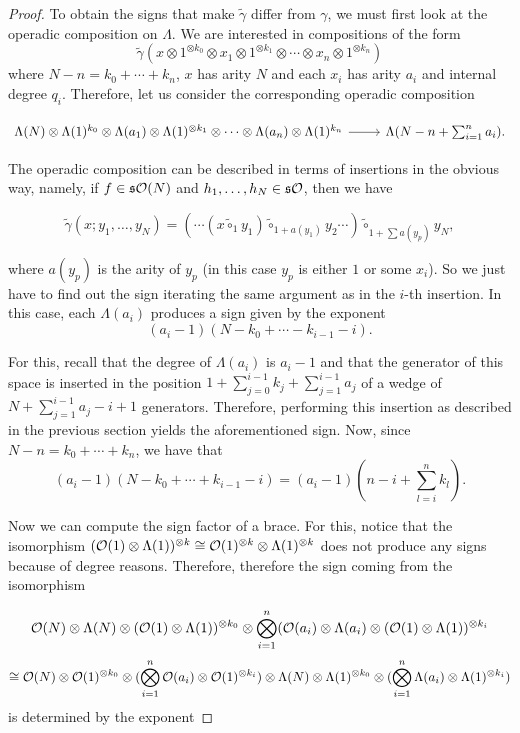 \documentclass[join.tex]{subfiles}
\begin{document}
\begin{proof}
To obtain the signs that make $\tilde{\gamma}$ differ from $\gamma$, we must first look at the operadic composition on $\Lambda$. 
We are interested in compositions of the form \[\tilde{\gamma}(x\otimes 1^{\otimes k_0}\otimes x_1\otimes 1^{\otimes k_1}\otimes\cdots\otimes x_n\otimes 1^{\otimes k_n})\] where $N-n=k_0+\cdots+k_n$, $x$ has arity $N$ and each $x_i$ has arity $a_i$ and internal degree $q_i$. Therefore, let us consider the corresponding operadic composition 

\[
\begin{tikzcd}
\Lambda(N)\otimes\Lambda(1)^{k_0}\otimes\Lambda(a_1)\otimes\Lambda(1)^{\otimes k_1}\otimes\cdots\otimes\Lambda(a_n)\otimes\Lambda(1)^{k_n}\arrow[r] & \Lambda(N-n+\sum_{i=1}^na_i).
\end{tikzcd}
\]

The operadic composition can be described in terms of insertions in the obvious way, namely, if $f\in\mathfrak{s}{\mathcal O}(N)$ and $h_1,\dots, h_N\in\mathfrak{s}{\mathcal O}$, then we have

\[\tilde{\gamma}(x;y_1,\dots, y_N)=(\cdots(x\tilde{\circ}_1 y_1)\tilde{\circ}_{1+a(y_1)}y_2\cdots)\tilde{\circ}_{1+\sum a(y_p)}y_N,\]

where $a(y_p)$ is the arity of $y_p$ (in this case $y_p$ is either $1$ or some $x_i$). So we just have to find out the sign iterating the same argument as in the $i$-th insertion. In this case, each $\Lambda(a_i)$ produces a sign given by the exponent $$(a_i-1)(N-k_0+\cdots-k_{i-1}-i).$$ 

For this, recall that the degree of $\Lambda(a_i)$ is $a_i-1$ and that the generator of this space is inserted in the position $1+\sum_{j=0}^{i-1}k_j+\sum_{j=1}^{i-1}a_j$ of a wedge of $N+\sum_{j=1}^{i-1}a_j-i+1$ generators. Therefore, performing this insertion as described in the previous section yields the aforementioned sign. Now, since $N-n=k_0+\cdots+k_n$, we have that
\[(a_i-1)(N-k_0+\cdots+k_{i-1}-i)=(a_i-1)(n-i+\sum_{l=i}^nk_l).\]

Now we can compute the sign factor of a brace. For this, notice that the isomorphism $({\mathcal O}(1)\otimes \Lambda(1))^{\otimes k}\cong {\mathcal O}(1)^{\otimes k}\otimes \Lambda(1)^{\otimes k}$ does not produce any signs because of degree reasons. Therefore, therefore the sign coming from the isomorphism

\[{\mathcal O}(N)\otimes\Lambda(N)\otimes ({\mathcal O}(1)\otimes \Lambda(1))^{\otimes k_0}\otimes \bigotimes_{i=1}^n({\mathcal O}(a_i)\otimes\Lambda(a_i)\otimes({\mathcal O}(1)\otimes\Lambda(1))^{\otimes k_i}\]
\[\cong {\mathcal O}(N)\otimes{\mathcal O}(1)^{\otimes k_0}\otimes(\bigotimes_{i=1}^n {\mathcal O}(a_i)\otimes {\mathcal O}(1)^{\otimes k_i})\otimes \Lambda(N)\otimes\Lambda(1)^{\otimes k_0}\otimes(\bigotimes_{i=1}^n \Lambda(a_i)\otimes \Lambda(1)^{\otimes k_i})\]
is determined by the exponent


\end{proof}
\end{document}
